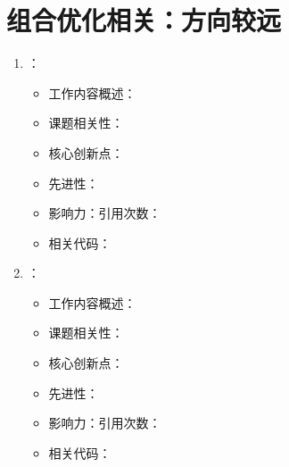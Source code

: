 \section{组合优化相关：方向较远}
\begin{enumerate}
    \item \citet{}：
        \begin{itemize}
            \item 工作内容概述：
            \item 课题相关性：
            \item 核心创新点：
            \item 先进性：
            \item 影响力：引用次数：
            \item 相关代码：
        \end{itemize}
    \item \citet{}：
        \begin{itemize}
            \item 工作内容概述：
            \item 课题相关性：
            \item 核心创新点：
            \item 先进性：
            \item 影响力：引用次数：
            \item 相关代码：
        \end{itemize}
\end{enumerate}